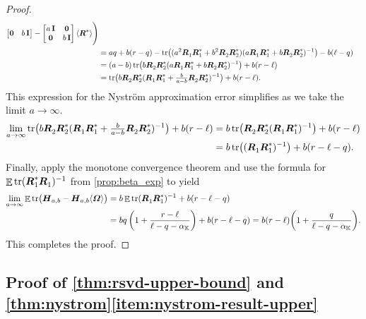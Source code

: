 \documentclass[11pt]{article}
\newcommand{\field}{\mathbb{K}}
\DeclareMathOperator{\tr}{tr}
\newcommand{\mat}[1]{\boldsymbol{#1}}
\newcommand{\Id}{\mathbf{I}}
\DeclareMathOperator{\expect}{\mathbb{E}}
\theoremstyle{definition}
\numberwithin{equation}{section}
\begin{document}
\begin{proof}
\begin{align*}
\begin{bmatrix}
        \mat{0} & b\,\Id
        \end{bmatrix}
        - \begin{bmatrix} a\,\Id & \mat{0} \\
        \mat{0} & b\,\Id
        \end{bmatrix} \langle \mat{R}^* \rangle\Biggr) \\
        &= aq + b(r-q) - \tr\bigl( (a^2 \mat{R}_1^{\vphantom{*}} \mat{R}_1^* + b^2 \mat{R}_2^{\vphantom{*}} \mat{R}_2^*) (a \mat{R}_1^{\vphantom{*}} \mat{R}_1^* + b \mat{R}_2^{\vphantom{*}} \mat{R}_2^*)^{-1} \bigr) - b(\ell - q) \\
        &= (a-b) \tr\bigl( b\mat{R}_2^{\vphantom{*}} \mat{R}_2^* (a \mat{R}_1^{\vphantom{*}} \mat{R}_1^* + b \mat{R}_2^{\vphantom{*}} \mat{R}_2^*)^{-1}\bigr) + b(r-\ell) \\
        &= \tr\bigl( b\mat{R}_2^{\vphantom{*}} \mat{R}_2^* (\mat{R}_1^{\vphantom{*}} \mat{R}_1^* + \tfrac{b}{a-b} \mat{R}_2^{\vphantom{*}} \mat{R}_2^*)^{-1}\bigr) + b(r-\ell).
    \end{align*}
    This expression for the Nystr\"om approximation error simplifies as we take the limit $a \rightarrow \infty$.
    \begin{align*}
        \lim_{a \rightarrow \infty} \tr\bigl( b\mat{R}_2^{\vphantom{*}} \mat{R}_2^* (\mat{R}_1^{\vphantom{*}} \mat{R}_1^* + \tfrac{b}{a-b} \mat{R}_2^{\vphantom{*}} \mat{R}_2^*)^{-1}\bigr) + b(r-\ell)
        &= b \tr \bigl(\mat{R}_2^{\vphantom{*}} \mat{R}_2^* (\mat{R}_1^{\vphantom{*}} \mat{R}_1^*)^{-1}\bigr) + b(r-\ell) \\
        &= b \tr\bigl( (\mat{R}_1^{\vphantom{*}} \mat{R}_1^*)^{-1}\bigr) + b(r-\ell - q).
    \end{align*}
    Finally, apply the monotone convergence theorem and use the formula for $\expect \tr(\mat{R}_1^*\mat{R}_1^{\vphantom{*}})^{-1}$ from \cref{prop:beta_exp} to yield
    \begin{align*}
    	\lim_{a \rightarrow \infty} \expect \tr\bigl(\mat{H}_{a,b} - \mat{H}_{a,b}\langle \mat{\varOmega} \rangle\bigr)
        &= b \expect \tr(\mat{R}_1^{\vphantom{*}} \mat{R}_1^*)^{-1} + b(r-\ell-q) \\
        &= b q \left(1 + \frac{r -\ell}{\ell - q - \alpha_\field}\right) + b(r-\ell-q)
        = b(r-\ell) \biggl(1 + \frac{q}{\ell - q - \alpha_\field}\biggr).
    \end{align*}
    This completes the proof.
\end{proof}

\subsection{Proof of \texorpdfstring{\cref{thm:rsvd-upper-bound}}{Theorem 3.2} and  \texorpdfstring{\cref{thm:nystrom}\ref{item:nystrom-result-upper}}{Theorem 3.6(a)}} \label{sec:proof_rsvd}
\end{document}
